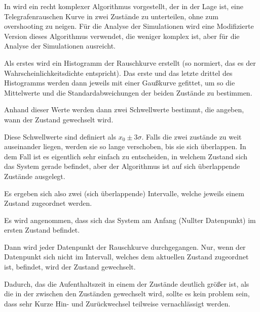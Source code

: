 \documentclass[main.tex]{subfiles}
\begin{document}



In \cite{random-telegraph-analysis} wird ein recht komplexer Algorithmus vorgestellt, der in der Lage ist, eine Telegrafenrauschen Kurve in zwei Zustände zu unterteilen, ohne zum overshooting zu neigen. Für die Analyse der Simulationen wird eine Modifizierte Version dieses Algorithmus verwendet, die weniger komplex ist, aber für die Analyse der Simulationen ausreicht.


Als erstes wird ein Histogramm der Rauschkurve erstellt (so normiert, das es der Wahrscheinlichkeitsdichte entspricht). 
Das erste und das letzte drittel des Histogramms werden dann jeweils mit einer Gaußkurve gefittet, um so die Mittelwerte und die Standardabweichungen der beiden Zustände zu bestimmen.


Anhand dieser Werte werden dann zwei Schwellwerte bestimmt, die angeben, wann der Zustand gewechselt wird.

Diese Schwellwerte sind definiert als \(x_0 \pm 3\sigma\). Falls die zwei zustände zu weit auseinander liegen, werden sie so lange verschoben, bis sie sich überlappen. 
In dem Fall ist es eigentlich sehr einfach zu entscheiden, in welchem Zustand sich das System gerade befindet, aber der Algorithmus ist auf sich überlappende Zustände ausgelegt.

Es ergeben sich also zwei (sich überlappende) Intervalle, welche jeweils einem Zustand zugeordnet werden.


Es wird angenommen, dass sich das System am Anfang (Nullter Datenpunkt) im ersten Zustand befindet.

Dann wird jeder Datenpunkt der Rauschkurve durchgegangen. Nur, wenn der Datenpunkt sich nicht im Intervall, welches dem aktuellen Zustand zugeordnet ist, befindet, wird der Zustand gewechselt.


Dadurch, das die Aufenthaltszeit in einem der Zustände deutlich größer ist, als die in der zwischen den Zuständen gewechselt wird, sollte es kein problem sein, dass sehr Kurze Hin- und Zurückwechsel teilweise vernachlässigt werden. 
\end{document}
